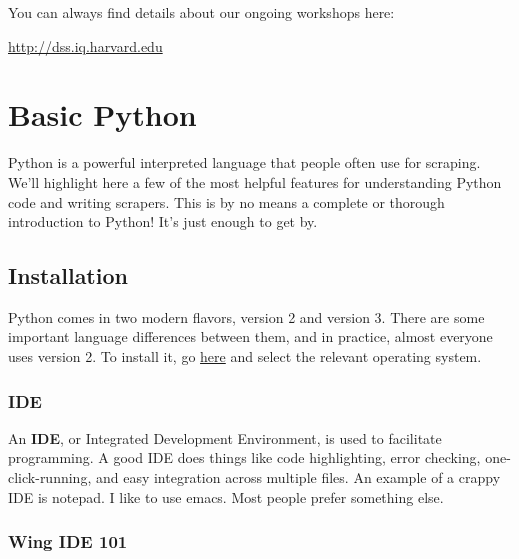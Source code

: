 \documentclass[11pt]{article}
\begin{document}
You can always find details about our ongoing workshops here:

\href{http://dss.iq.harvard.edu}{http://dss.iq.harvard.edu}
\section{Basic Python}
\label{sec-2}

Python is a powerful interpreted language that people often use for
scraping.  We'll highlight here a few of the most helpful features for
understanding Python code and writing scrapers.  This is by no means a
complete or thorough introduction to Python!  It's just enough to get
by.
\subsection{Installation}
\label{sec-2-1}

   Python comes in two modern flavors, version 2 and version 3.  There
   are some important language differences between them, and in
   practice, almost everyone uses version 2.  To install it, go \href{http://python.org/download/}{here}
   and select the relevant operating system.
\subsubsection{IDE}
\label{sec-2-1-1}

   An \textbf{IDE}, or Integrated Development Environment, is used to
   facilitate programming.  A good IDE does things like code
   highlighting, error checking, one-click-running, and easy
   integration across multiple files.  An example of a crappy IDE is
   notepad.  I like to use emacs.  Most people prefer something else.
\subsubsection{Wing IDE 101}
\label{sec-2-1-2}
\end{document}
